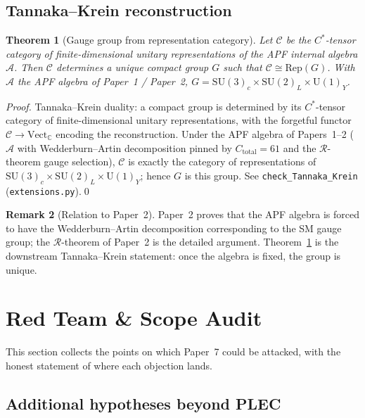 \documentclass[11pt,a4paper]{article}
\newtheorem{theorem}{Theorem}[section]
\theoremstyle{definition}
\newtheorem{remark}[theorem]{Remark}
\newcommand{\Ctot}{C_{\mathrm{total}}}
\newcommand{\SU}[1]{\mathrm{SU}(#1)}
\newcommand{\U}[1]{\mathrm{U}(#1)}
\newcommand{\coderef}[2]{\texttt{#1}\,(\texttt{#2})}
\begin{document}
\subsection{Tannaka--Krein reconstruction}

\begin{theorem}[Gauge group from representation category]
\label{thm:TK}
Let $\mathcal{C}$ be the $C^*$-tensor category of finite-dimensional unitary representations of the APF internal algebra $\mathcal{A}$.  Then $\mathcal{C}$ determines a unique compact group $G$ such that $\mathcal{C}\cong \mathrm{Rep}(G)$.  With $\mathcal{A}$ the APF algebra of Paper~1 / Paper~2, $G=\SU{3}_c\times\SU{2}_L\times\U{1}_Y$.
\end{theorem}

\begin{proof}
Tannaka--Krein duality: a compact group is determined by its $C^*$-tensor category of finite-dimensional unitary representations, with the forgetful functor $\mathcal{C}\to\mathrm{Vect}_{\mathbb{C}}$ encoding the reconstruction.  Under the APF algebra of Papers~1--2 ($\mathcal{A}$ with Wedderburn--Artin decomposition pinned by $\Ctot=61$ and the $\mathcal{R}$-theorem gauge selection), $\mathcal{C}$ is exactly the category of representations of $\SU{3}_c\times\SU{2}_L\times\U{1}_Y$; hence $G$ is this group.  See \coderef{check\_Tannaka\_Krein}{extensions.py}.\qed
\end{proof}

\begin{remark}[Relation to Paper~2]
Paper~2 proves that the APF algebra is forced to have the Wedderburn--Artin decomposition corresponding to the SM gauge group; the $\mathcal{R}$-theorem of Paper~2 is the detailed argument.  Theorem~\ref{thm:TK} is the downstream Tannaka--Krein statement: once the algebra is fixed, the group is unique.
\end{remark}

\section{Red Team \& Scope Audit}\label{sec:redteam}
\setcounter{theorem}{0}

This section collects the points on which Paper~7 could be attacked, with the honest statement of where each objection lands.

\subsection{Additional hypotheses beyond PLEC}
\end{document}
